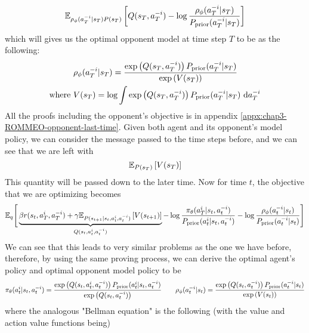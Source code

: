 \begin{equation}
    \mathbb{E}_{ \rho_{\phi}(a^{-i}_T | s_T) P(s_T)}\left[  Q(s_T, a^{-i}_T) - \log \frac{\rho_{\phi}(a^{-i}_T | s_T)}{P_{\text{prior}}(a^{-i}_T | s_T)}  \right]
\end{equation}
which will gives us the optimal opponent model at time step $T$ to be as the following:
\begin{equation}
\begin{aligned}
    &\rho_{\phi}(a^{-i}_T | s_T)  = \frac{ \exp\left( Q(s_T, a^{-i}_T) \right)P_{\text{prior}}(a^{-i}_T | s_T) }{\exp\left( V(s_T) \right)}  \\
    \text{where }& V(s_T) = \log \int \exp\left( Q(s_T, a^{-i}_T) \right)P_{\text{prior}}(a^{-i}_T | s_T) \ \mathrm{d} a^{-i}_T
\end{aligned}
\end{equation}
All the proofs including the opponent's objective is in appendix \ref{appx:chap3-ROMMEO-opponent-last-time}. Given both agent and its opponent's model policy, we can consider the message passed to the time steps before, and we can see that we are left with
\begin{equation}
    \mathbb{E}_{P(s_T)}\left[ V(s_T) \right]
\end{equation}
This quantity will be passed down to the later time. Now for time $t$, the objective that we are optimizing becomes 
\begin{equation}
    \mathbb{E}_{q} \Bigg[ \underbrace{\beta r(s_t, a^i_T, a^{-i}_T) + \gamma \mathbb{E}_{P(s_{t+1} | s_t, a^i_t, a^{-i}_t)}  \left[ V(s_{t+1}) \right]}_{Q(s_t, a^i_t, a^{-i}_t)}  - \log \frac{\pi_{\theta}(a^i_T | s_t, a^{-i}_t)}{P_{\text{prior}}(a^i_t | s_t, a^{-i}_t) } - \log \frac{\rho_{\phi}(a^{-i}_t | s_t)}{P_{\text{prior}}(a^{-i}_t | s_t)} \Bigg]
\end{equation}
We can see that this leads to very similar problems as the one we have before, therefore, by using the same proving process, we can derive the optimal agent's policy and  optimal opponent model policy to be 
\begin{equation}
\begin{aligned}
    \label{eqn:chap3-final-ROMMEO-policy}
    \pi_{\theta}(a^i_t | s_t, a^{-i}_t) = \frac{\exp \left( Q(s_t, a^i_t, a^{-i}_t) \right)P_{\text{prior}}(a^i_t | s_t, a^{-i}_t) }{\exp\left( Q(s_t, a^{-i}_t) \right)} \quad \quad \rho_{\phi}(a^{-i}_t | s_t) = \frac{ \exp\left( Q(s_t, a^{-i}_t) \right)P_{\text{prior}}(a^{-i}_t | s_t) }{\exp\left( V(s_t) \right)}
\end{aligned}
\end{equation}
where the analogous "Bellman equation" is the following (with the value and action value functions being)
